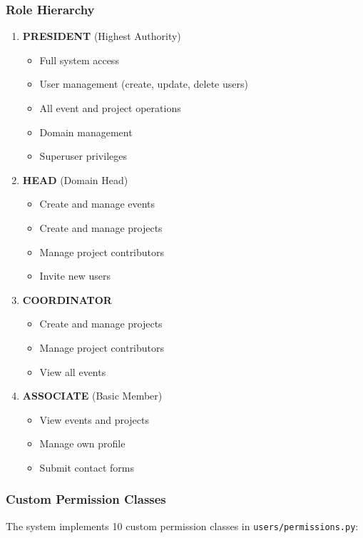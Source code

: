 \documentclass[11pt,a4paper]{article}
\begin{document}
\subsubsection{Role Hierarchy}
\begin{enumerate}[leftmargin=*]
    \item \textbf{PRESIDENT} (Highest Authority)
    \begin{itemize}
        \item Full system access
        \item User management (create, update, delete users)
        \item All event and project operations
        \item Domain management
        \item Superuser privileges
    \end{itemize}
    
    \item \textbf{HEAD} (Domain Head)
    \begin{itemize}
        \item Create and manage events
        \item Create and manage projects
        \item Manage project contributors
        \item Invite new users
    \end{itemize}
    
    \item \textbf{COORDINATOR}
    \begin{itemize}
        \item Create and manage projects
        \item Manage project contributors
        \item View all events
    \end{itemize}
    
    \item \textbf{ASSOCIATE} (Basic Member)
    \begin{itemize}
        \item View events and projects
        \item Manage own profile
        \item Submit contact forms
    \end{itemize}
\end{enumerate}

\subsubsection{Custom Permission Classes}
The system implements 10 custom permission classes in \texttt{users/permissions.py}:
\end{document}
